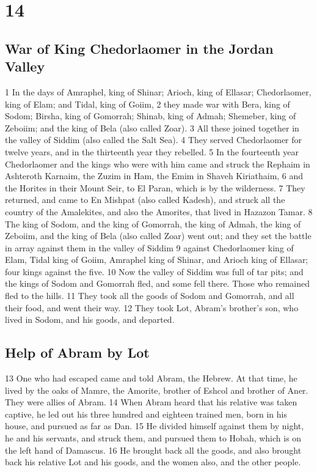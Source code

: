 \hypertarget{section-13}{%
\section{14}\label{section-13}}

\hypertarget{war-of-king-chedorlaomer-in-the-jordan-valley}{%
\subsection{War of King Chedorlaomer in the Jordan
Valley}\label{war-of-king-chedorlaomer-in-the-jordan-valley}}

{1} In the days of Amraphel, king of Shinar; Arioch, king of Ellasar;
Chedorlaomer, king of Elam; and Tidal, king of Goiim, {2} they made war
with Bera, king of Sodom; Birsha, king of Gomorrah; Shinab, king of
Admah; Shemeber, king of Zeboiim; and the king of Bela (also called
Zoar). {3} All these joined together in the valley of Siddim (also
called the Salt Sea). {4} They served Chedorlaomer for twelve years, and
in the thirteenth year they rebelled. {5} In the fourteenth year
Chedorlaomer and the kings who were with him came and struck the Rephaim
in Ashteroth Karnaim, the Zuzim in Ham, the Emim in Shaveh Kiriathaim,
{6} and the Horites in their Mount Seir, to El Paran, which is by the
wilderness. {7} They returned, and came to En Mishpat (also called
Kadesh), and struck all the country of the Amalekites, and also the
Amorites, that lived in Hazazon Tamar. {8} The king of Sodom, and the
king of Gomorrah, the king of Admah, the king of Zeboiim, and the king
of Bela (also called Zoar) went out; and they set the battle in array
against them in the valley of Siddim {9} against Chedorlaomer king of
Elam, Tidal king of Goiim, Amraphel king of Shinar, and Arioch king of
Ellasar; four kings against the five. {10} Now the valley of Siddim was
full of tar pits; and the kings of Sodom and Gomorrah fled, and some
fell there. Those who remained fled to the hills. {11} They took all the
goods of Sodom and Gomorrah, and all their food, and went their way.
{12} They took Lot, Abram's brother's son, who lived in Sodom, and his
goods, and departed.

\hypertarget{help-of-abram-by-lot}{%
\subsection{Help of Abram by Lot}\label{help-of-abram-by-lot}}

{13} One who had escaped came and told Abram, the Hebrew. At that time,
he lived by the oaks of Mamre, the Amorite, brother of Eshcol and
brother of Aner. They were allies of Abram. {14} When Abram heard that
his relative was taken captive, he led out his three hundred and
eighteen trained men, born in his house, and pursued as far as Dan. {15}
He divided himself against them by night, he and his servants, and
struck them, and pursued them to Hobah, which is on the left hand of
Damascus. {16} He brought back all the goods, and also brought back his
relative Lot and his goods, and the women also, and the other people.

